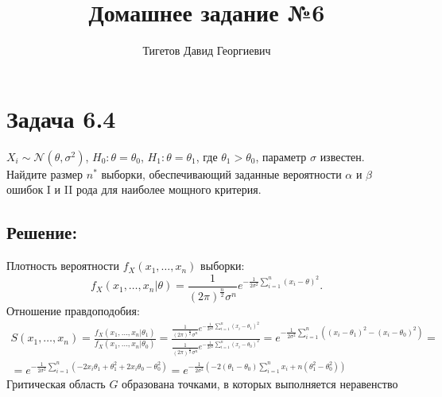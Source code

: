 \documentclass[12pt]{article}
\begin{document}
    \title{Домашнее задание №6}
    \author{Тигетов Давид Георгиевич}
    \date{}
    \maketitle

    \section*{Задача 6.4}
    $X_i \sim \mathcal{N} \left ( \theta, \sigma^2 \right )$, $H_0: \theta = \theta_0$, $H_1: \theta = \theta_1$, где $\theta_1 > \theta_0$, параметр $\sigma$ известен. Найдите размер
    $n^*$ выборки, обеспечивающий заданные вероятности $\alpha$ и $\beta$ ошибок I и II рода для наиболее мощного критерия.

    \subsection*{Решение:}
    Плотность вероятности $f_X(x_1, \dots, x_n)$ выборки:
    \[
        f_X(x_1, \dots, x_n | \theta) = \frac{1}{\left ( 2 \pi \right )^{\frac{n}{2}} \sigma^n} e^{-\frac{1}{2 \sigma^2} \sum_{i=1}^n \left ( x_i - \theta \right )^2}.
    \]
    Отношение правдоподобия:
    \begin{multline*}
        S(x_1, \dots, x_n)
        = \frac{f_X(x_1, \dots, x_n | \theta_1)}{f_X(x_1, \dots, x_n | \theta_0)}
        = \frac{\frac{1}{\left ( 2 \pi \right )^{\frac{n}{2}} \sigma^n} e^{-\frac{1}{2 \sigma^2} \sum_{i=1}^n \left ( x_i - \theta_1 \right )^2}}{\frac{1}{\left ( 2 \pi \right )^{\frac{n}{2}} \sigma^n} e^{-\frac{1}{2 \sigma^2} \sum_{i=1}^n \left ( x_i - \theta_0 \right )^2}}
        = e^{- \frac{1}{2 \sigma^2} \sum_{i=1}^n \left ( \left ( x_i - \theta_1 \right )^2 - \left ( x_i - \theta_0 \right )^2 \right )} = \\
        = e^{- \frac{1}{2 \sigma^2} \sum_{i=1}^n \left ( - 2 x_i \theta_1 + \theta_1^2 + 2 x_i \theta_0 - \theta_0^2 \right )}
        = e^{- \frac{1}{2 \sigma^2} \left ( - 2 \left ( \theta_1 - \theta_0 \right ) \sum_{i=1}^n x_i + n \left ( \theta_1^2 - \theta_0^2 \right ) \right )}
    \end{multline*}
    Гритическая область $G$ образована точками, в которых выполняется неравенство
\end{document}
